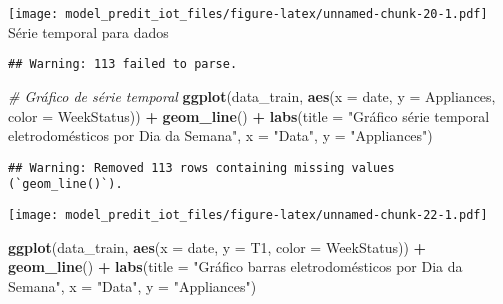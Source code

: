 \documentclass[
]{article}
\newenvironment{Shaded}{\begin{snugshade}}{\end{snugshade}}
\newcommand{\AttributeTok}[1]{\textcolor[rgb]{0.13,0.29,0.53}{#1}}
\newcommand{\CommentTok}[1]{\textcolor[rgb]{0.56,0.35,0.01}{\textit{#1}}}
\newcommand{\FunctionTok}[1]{\textcolor[rgb]{0.13,0.29,0.53}{\textbf{#1}}}
\newcommand{\NormalTok}[1]{#1}
\newcommand{\OtherTok}[1]{\textcolor[rgb]{0.56,0.35,0.01}{#1}}
\newcommand{\SpecialCharTok}[1]{\textcolor[rgb]{0.81,0.36,0.00}{\textbf{#1}}}
\newcommand{\StringTok}[1]{\textcolor[rgb]{0.31,0.60,0.02}{#1}}
\begin{document}
\texttt{[image: model\_predit\_iot\_files/figure-latex/unnamed-chunk-20-1.pdf]}
Série temporal para dados

\begin{Shaded}
\end{Shaded}

\begin{verbatim}
## Warning: 113 failed to parse.
\end{verbatim}

\begin{Shaded}
\begin{Highlighting}[]
\CommentTok{\# Gráfico de série temporal}
\FunctionTok{ggplot}\NormalTok{(data\_train, }\FunctionTok{aes}\NormalTok{(}\AttributeTok{x =}\NormalTok{ date, }\AttributeTok{y =}\NormalTok{ Appliances, }\AttributeTok{color =}\NormalTok{ WeekStatus)) }\SpecialCharTok{+}
  \FunctionTok{geom\_line}\NormalTok{() }\SpecialCharTok{+}
  \FunctionTok{labs}\NormalTok{(}\AttributeTok{title =} \StringTok{"Gráfico série temporal eletrodomésticos por Dia da Semana"}\NormalTok{,}
       \AttributeTok{x =} \StringTok{"Data"}\NormalTok{,}
       \AttributeTok{y =} \StringTok{"Appliances"}\NormalTok{)}
\end{Highlighting}
\end{Shaded}

\begin{verbatim}
## Warning: Removed 113 rows containing missing values (`geom_line()`).
\end{verbatim}

\texttt{[image: model\_predit\_iot\_files/figure-latex/unnamed-chunk-22-1.pdf]}

\begin{Shaded}
\begin{Highlighting}[]
\FunctionTok{ggplot}\NormalTok{(data\_train, }\FunctionTok{aes}\NormalTok{(}\AttributeTok{x =}\NormalTok{ date, }\AttributeTok{y =}\NormalTok{ T1, }\AttributeTok{color =}\NormalTok{ WeekStatus)) }\SpecialCharTok{+}
  \FunctionTok{geom\_line}\NormalTok{() }\SpecialCharTok{+}
  \FunctionTok{labs}\NormalTok{(}\AttributeTok{title =} \StringTok{"Gráfico barras eletrodomésticos por Dia da Semana"}\NormalTok{,}
       \AttributeTok{x =} \StringTok{"Data"}\NormalTok{,}
       \AttributeTok{y =} \StringTok{"Appliances"}\NormalTok{)}
\end{Highlighting}
\end{Shaded}
\end{document}
